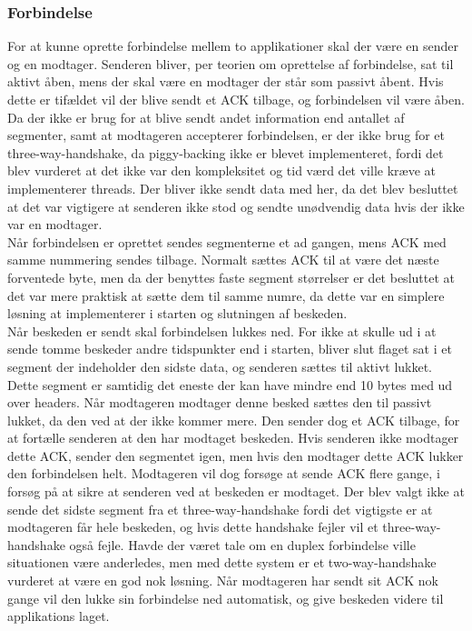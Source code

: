 \subsubsection{Forbindelse}
For at kunne oprette forbindelse mellem to applikationer skal der være en sender og en modtager. Senderen bliver, per teorien om oprettelse af forbindelse, sat til aktivt åben, mens der skal være en modtager der står som passivt åbent. Hvis dette er tifældet vil der blive sendt et ACK tilbage, og forbindelsen vil være åben. Da der ikke er brug for at blive sendt andet information end antallet af segmenter, samt at modtageren accepterer forbindelsen, er der ikke brug for et three-way-handshake, da piggy-backing ikke er blevet implementeret, fordi det blev vurderet at det ikke var den kompleksitet og tid værd det ville kræve at implementerer threads. Der bliver ikke sendt data med her, da det blev besluttet at det var vigtigere at senderen ikke stod og sendte unødvendig data hvis der ikke var en modtager.
\\
Når forbindelsen er oprettet sendes segmenterne et ad gangen, mens ACK med samme nummering sendes tilbage. Normalt sættes ACK til at være det næste forventede byte, men da der benyttes faste segment størrelser er det besluttet at det var mere praktisk at sætte dem til samme numre, da dette var en simplere løsning at implementerer i starten og slutningen af beskeden. 
\\
Når beskeden er sendt skal forbindelsen lukkes ned. For ikke at skulle ud i at sende tomme beskeder andre tidspunkter end i starten, bliver slut flaget sat i et segment der indeholder den sidste data, og senderen sættes til aktivt lukket. Dette segment er samtidig det eneste der kan have mindre end 10 bytes med ud over headers. Når modtageren modtager denne besked sættes den til passivt lukket, da den ved at der ikke kommer mere. Den sender dog et ACK tilbage, for at fortælle senderen at den har modtaget beskeden. Hvis senderen ikke modtager dette ACK, sender den segmentet igen, men hvis den modtager dette ACK lukker den forbindelsen helt. Modtageren vil dog forsøge at sende ACK flere gange, i forsøg på at sikre at senderen ved at beskeden er modtaget. Der blev valgt ikke at sende det sidste segment fra et three-way-handshake fordi det vigtigste er at modtageren får hele beskeden, og hvis dette handshake fejler vil et three-way-handshake også fejle. Havde der været tale om en duplex forbindelse ville situationen være anderledes, men med dette system er et two-way-handshake vurderet at være en god nok løsning. Når modtageren har sendt sit ACK nok gange vil den lukke sin forbindelse ned automatisk, og give beskeden videre til applikations laget.

